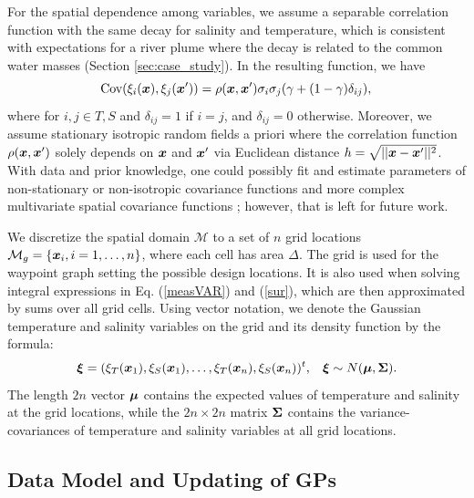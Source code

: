 \documentclass[aoas]{imsart}
\begin{document}
For the spatial dependence among variables, we assume a separable correlation function with the same decay for salinity and temperature,
which is consistent with expectations for  a river plume where the decay is related to the common water masses (Section \ref{sec:case_study}). In the resulting function, we have
\begin{equation}\label{gp_corr}
\mbox{Cov}(\xi_i(\bx),\xi_j(\bx')) = \rho(\bx,\bx') \sigma_i \sigma_j (\gamma +(1-\gamma )\delta_{ij}), \\
\end{equation}
where for $i,j \in {T,S}$ and $\delta_{ij}=1$ if $i=j$, and $\delta_{ij}=0$
otherwise. Moreover, we assume stationary isotropic random fields a priori where the
correlation function $\rho({\boldsymbol x},{\boldsymbol x}')$ solely depends on ${\boldsymbol x}$ and
${\boldsymbol x}'$ via Euclidean distance $h=\sqrt{||{\boldsymbol x}-{\boldsymbol x}'||^2}$. With
data and prior knowledge, one could possibly fit and estimate
parameters of non-stationary or non-isotropic covariance functions and
more complex multivariate spatial covariance functions
\citep{gneiting2010matern,genton2015cross}; however, that is left for
future work.

We discretize the spatial domain
$\mathcal{M}$ to a set of $n$ grid locations
$\mathcal{M}_g = \{{\boldsymbol x}_i, i=1,\ldots,n \}$, where each cell has area $\Delta$. The
grid is used for the waypoint graph setting the possible design locations. It is also used when solving integral expressions in Eq. (\ref{measVAR}) and
(\ref{sur}), which are then approximated by sums over all grid cells.  Using vector
notation, we denote the Gaussian temperature and salinity variables on
the grid and its density function by the formula: 
\begin{equation}\label{prior}
    \bxi = (\xi_T(\bx_1),\xi_S(\bx_1),\ldots,\xi_T(\bx_n),\xi_S(\bx_n))^t, \hspace{3mm}
    \bxi  \sim  N(\bmu, \bSigma). %
\end{equation}
The length $2 n$ vector ${\boldsymbol \mu}$ contains the expected values of
temperature and salinity at the grid locations, while the
$2n \times 2n$ matrix ${\boldsymbol \Sigma}$ contains the
variance-covariances of temperature and salinity variables at all grid
locations.

\subsection{Data Model and Updating of GPs}
\end{document}
